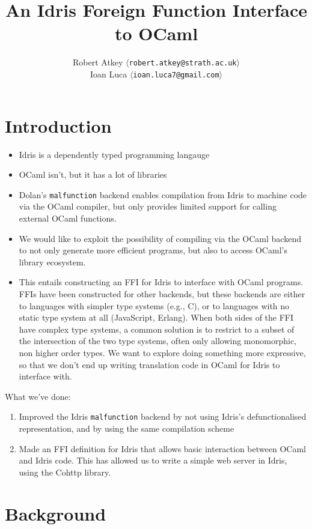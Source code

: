\documentclass[a4paper,twocolumn]{article}
\title{An Idris Foreign Function Interface to OCaml}
\author{Robert Atkey  $\langle$\texttt{robert.atkey@strath.ac.uk}$\rangle$ \\
  Ioan Luca $\langle$\texttt{ioan.luca7@gmail.com}$\rangle$}
\date{}
\newcommand{\malfunction}{\texttt{malfunction}}
\begin{document}
\maketitle

\section{Introduction}



\begin{itemize}
\item Idris is a dependently typed programming langauge
\item OCaml isn't, but it has a lot of libraries
\item Dolan's \texttt{malfunction} backend enables compilation from
  Idris to machine code via the OCaml compiler, but only provides
  limited support for calling external OCaml functions.
\item We would like to exploit the possibility of compiling via the
  OCaml backend to not only generate more efficient programs, but also
  to access OCaml's library ecosystem.
\item This entails constructing an FFI for Idris to interface with
  OCaml programs. FFIs have been constructed for other backends, but
  these backends are either to languages with simpler type systems
  (e.g., C), or to languages with no static type system at all
  (JavaScript, Erlang). When both sides of the FFI have complex type
  systems, a common solution is to restrict to a subset of the
  intersection of the two type systems, often only allowing
  monomorphic, non higher order types. We want to explore doing
  something more expressive, so that we don't end up writing
  translation code in OCaml for Idris to interface with.
\end{itemize}

What we've done:
\begin{enumerate}
\item Improved the Idris \malfunction{} backend by not using Idris's
  defunctionalised representation, and by using the same compilation
  scheme
\item Made an FFI definition for Idris that allows basic interaction
  between OCaml and Idris code. This has allowed us to write a simple
  web server in Idris, using the Cohttp library.
\end{enumerate}

\section{Background}
\end{document}
